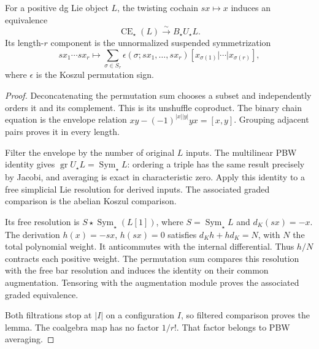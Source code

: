 \begin{lemma}\label{cbc:va:chevalley-bar}
For a positive dg Lie object $L$, the twisting
cochain $sx\mapsto x$ induces an equivalence
\[
 \operatorname{CE}_\star(L)\xrightarrow{\sim}B_\star U_\star L.
\]
Its length-$r$ component is the unnormalized
suspended symmetrization
\[
 sx_1\cdots sx_r\longmapsto
 \sum_{\sigma\in S_r}\epsilon(\sigma;sx_1,\ldots,sx_r)
       [x_{\sigma(1)}|\cdots|x_{\sigma(r)}],
\]
where $\epsilon$ is the Koszul permutation sign.
\end{lemma}
\begin{proof}
Deconcatenating the permutation sum chooses a
subset and independently orders it and its
complement. This is its unshuffle coproduct.
The binary chain equation is the envelope
relation
$xy-(-1)^{|x||y|}yx=[x,y]$. Grouping adjacent
pairs proves it in every length.

Filter the envelope by the number of original
$L$ inputs. The multilinear PBW identity gives
$\operatorname{gr}U_\star L=\operatorname{Sym}_\star L$:
ordering a triple has the same result precisely
by Jacobi, and averaging is exact in characteristic
zero. Apply this identity to a free simplicial
Lie resolution for derived inputs.
The associated graded comparison is the abelian
Koszul comparison.

Its free resolution is
$S\star\operatorname{Sym}_\star(L[1])$, where
$S=\operatorname{Sym}_\star L$ and
$d_K(sx)=-x$. The derivation $h(x)=-sx$,
$h(sx)=0$ satisfies $d_Kh+hd_K=N$, with
$N$ the total polynomial weight.
It anticommutes with the internal differential.
Thus $h/N$ contracts each positive weight.
The permutation sum compares this resolution
with the free bar resolution and induces the
identity on their common augmentation.
Tensoring with the augmentation module proves
the associated graded equivalence.

Both filtrations stop at $|I|$ on a configuration
$I$, so filtered comparison proves the lemma.
The coalgebra map has no factor $1/r!$.
That factor belongs to PBW averaging.
\end{proof}


